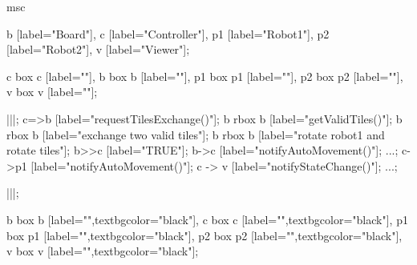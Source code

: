 \begin{msc}
msc
{

b [label="Board"],
c [label="Controller"],
p1 [label="Robot1"],
p2 [label="Robot2"],
v [label="Viewer"];

c box c [label=""],
b box b [label=""],
p1 box p1 [label=""],
p2 box p2 [label=""],
v box v [label=""];

|||;
c=>b [label="requestTilesExchange()"];
b rbox b [label="getValidTiles()"];
b rbox b [label="exchange two valid tiles"];
b rbox b [label="rotate robot1 and rotate tiles"];
b>>c [label="TRUE"];
b->c [label="notifyAutoMovement()"];
...;
c->p1 [label="notifyAutoMovement()"];
c -> v [label="notifyStateChange()"];
...;

|||;

b box b [label="",textbgcolor="black"],
c box c [label="",textbgcolor="black"],
p1 box p1 [label="",textbgcolor="black"],
p2 box p2 [label="",textbgcolor="black"],
v box v [label="",textbgcolor="black"];

}
\end{msc}

